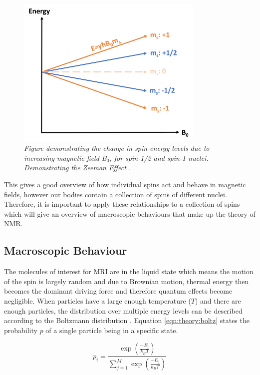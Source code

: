 \begin{figure}[h]
    \centering
    \includegraphics[width=0.8\textwidth]{Figures/Theory/Zeeman.png}
    \caption{\textit{Figure demonstrating the change in spin energy levels due to increasing magnetic field B$_0$, for spin-1/2 and spin-1 nuclei. Demonstrating the Zeeman Effect \cite{Zeeman1896VerslagenAfdeeling}.}}
    \label{fig:theory:zeeman}
\end{figure}

This gives a good overview of how individual spins act and behave in magnetic fields, however our bodies contain a collection of spins of different nuclei. Therefore, it is important to apply these relationships to a collection of spins which will give an overview of macroscopic behaviours that make up the theory of \ac{NMR}.

\subsection{Macroscopic Behaviour}

The molecules of interest for \ac{MRI} are in the liquid state which means the motion of the spin is largely random and due to Brownian motion, thermal energy then becomes the dominant driving force and therefore quantum effects become negligible. When particles have a large enough temperature ($T$) and there are enough particles, the distribution over multiple energy levels can be described according to the Boltzmann distribution \cite{Boltzmann1872WeitereGasmolekulen}. Equation \ref{eqn:theory:boltz} states the probability $p$ of a single particle being in a specific state.

\begin{equation}
    p_i = \frac{\exp\left(\frac{-E_i}{k_BT}\right)}{\displaystyle \sum_{j = 1}^{M}\exp\left(\frac{-E_j}{k_BT}\right)}
    \label{eqn:theory:boltz}
\end{equation}

